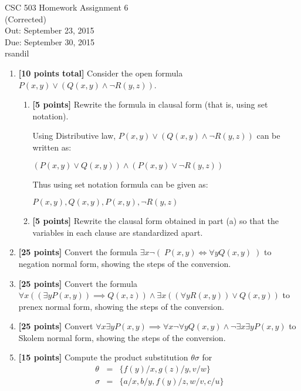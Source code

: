 \documentclass{article}
\def\unityid{rsandil}
\begin{document}
\begin{center}
  {\LARGE CSC 503 Homework Assignment 6}\\
  (Corrected) \\[1pc]
  Out: September 23, 2015 \\
  Due: September 30, 2015 \\
  \unityid
\end{center}

\begin{enumerate}

\item \textbf{[10 points total]} Consider the open formula
  $P(x,y) \lor (Q(x,y) \land \neg R(y,z))$.
  \begin{enumerate}

  \item \textbf{[5 points]} Rewrite the formula in clausal form (that
    is, using set notation).
  \begin{answer}
  Using Distributive law, $P(x,y) \lor (Q(x,y) \land \neg R(y,z))$ can be written as: 
  
  $(P(x,y) \lor Q(x,y))\land(P(x,y) \lor \neg R(y,z))$
  
  Thus using set notation formula can be given as:
  
  ${{P(x,y), Q(x,y)},{P(x,y),\neg R(y,z)}}$
 \end{answer}
  \item \textbf{[5 points]} Rewrite the clausal form obtained in part
    (a) so that the variables in each clause are standardized apart.

  \end{enumerate}

\item \textbf{[25 points]} Convert the formula
  $\exists x \neg (\; P(x,y) \iff \forall y Q(x,y) \;)$ to negation
  normal form, showing the steps of the conversion.

\item \textbf{[25 points]} Convert the formula
  $\forall x ((\exists y P(x,y)) \implies Q(x,z)) \land \exists x
  ((\forall y R(x,y)) \lor Q(x,y))$
  to prenex normal form, showing the steps of the conversion.

\item \textbf{[25 points]} Convert
  $\forall x \exists y P(x,y) \implies \forall x \neg \forall y Q(x,y)
  \land \neg \exists x \exists y P(x,y)$ 
  to Skolem normal form, showing the steps of the conversion.

\item \textbf{[15 points]} Compute the product substitution $\theta\sigma$
  for
  \begin{eqnarray*}
    \theta &=& \{ f(y)/x, g(z)/y, v/w \} \\
    \sigma &=& \{ a/x, b/y, f(y)/z, w/v, c/u \}
  \end{eqnarray*}

\end{enumerate}
\end{document}
